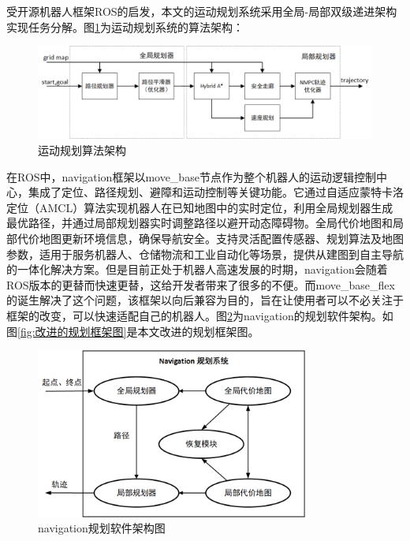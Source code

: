 \documentclass[master,academic]{ysuthesis} %
\begin{document}
	受开源机器人框架ROS的启发，本文的运动规划系统采用全局-局部双级递进架构实现任务分解。图\ref{fig:运动规划算法框架}为运动规划系统的算法架构：
		\begin{figure}[H]
			\centering
			\includegraphics[width=1.0\textwidth]{运动规划算法框架.png}
			\caption{运动规划算法架构}
			\label{fig:运动规划算法框架}
		\end{figure}

	在ROS中，navigation框架以move\_base节点作为整个机器人的运动逻辑控制中心，集成了定位、路径规划、避障和运动控制等关键功能。它通过自适应蒙特卡洛定位（​AMCL）算法实现机器人在已知地图中的实时定位，利用全局规划器生成最优路径，并通过局部规划器实时调整路径以避开动态障碍物。全局代价地图和局部代价地图更新环境信息，确保导航安全。支持灵活配置传感器、规划算法及地图参数，适用于服务机器人、仓储物流和工业自动化等场景，提供从建图到自主导航的一体化解决方案。但是目前正处于机器人高速发展的时期，navigation会随着ROS版本的更替而快速更替，这给开发者带来了很多的不便。而move\_base\_flex的诞生解决了这个问题，该框架以向后兼容为目的，旨在让使用者可以不必关注于框架的改变，可以快速适配自己的机器人。图\ref{fig:navigation规划框架图}为navigation的规划软件架构。如图\ref{fig:改进的规划框架图}是本文改进的规划框架图。
	\begin{figure}[H]
		\centering
		\includegraphics[width=0.8\textwidth]{navigation规划框架.png}
		\caption{navigation规划软件架构图}
		\label{fig:navigation规划框架图}
	\end{figure}
\end{document}
